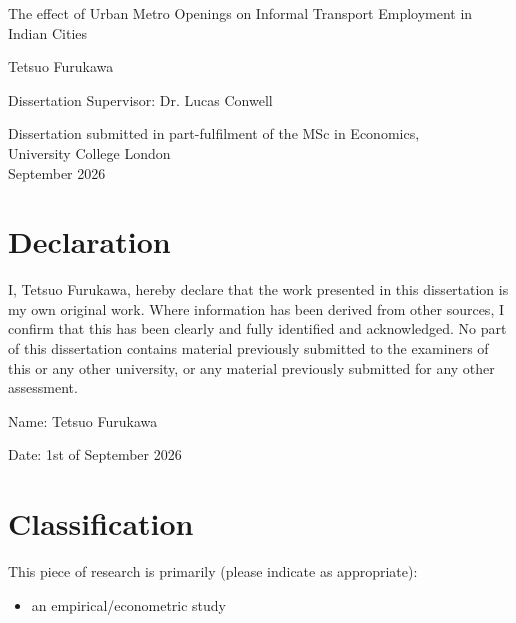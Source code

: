 \documentclass{article}
\begin{document}
 
  \begin{titlepage} 
    \vspace*{10cm} 
    \begin{center} 
        The effect of Urban Metro Openings on Informal Transport Employment in Indian Cities 
    \end{center} 
    
    \vspace{2.5cm} 
    
    \begin{center} 
        Tetsuo Furukawa
    \end{center} 
    
    \vspace{2.5cm} 
    
    \begin{center} 
        Dissertation Supervisor: Dr. Lucas Conwell
    \end{center} 
    \vspace{2cm} 
    
    \begin{center} Dissertation submitted in part-fulfilment of the MSc in Economics,\\[0.6em] 
        University College London\\[0.6em] 
        September 2026 
    \end{center} 
\end{titlepage} 

\section*{Declaration} 
I, Tetsuo Furukawa, hereby declare that the work presented in this dissertation is my own original work. Where information has been derived from other sources, I confirm that this has been clearly and fully identified and acknowledged. No part of this dissertation contains material previously submitted to the examiners of this or any other university, or any material previously submitted for any other assessment. 
\medskip 

Name: Tetsuo Furukawa

\medskip 

Date: 1st of September 2026

\vspace{2cm} 

\section*{Classification} This piece of research is primarily (please indicate as appropriate): 
\begin{itemize}[label=$\boxdot$, leftmargin=2em, itemsep=2pt, topsep=0.5em] 
    \item an empirical/econometric study 
\end{itemize} 
\end{document}
